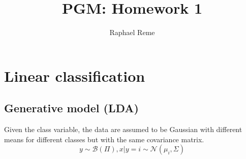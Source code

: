 \documentclass{article}
\title{PGM: Homework 1}
\author{Raphael Reme}
\begin{document}
\maketitle
\section{Linear classification}
\subsection{Generative model (LDA)}
Given the class variable, the data are assumed to be Gaussian with different means for different classes but with the same covariance matrix.
\begin{equation*}
    y \sim \mathcal{B}(\Pi), x | y=i \sim \mathcal{N}(\mu_i, \Sigma)
\end{equation*}
\end{document}
